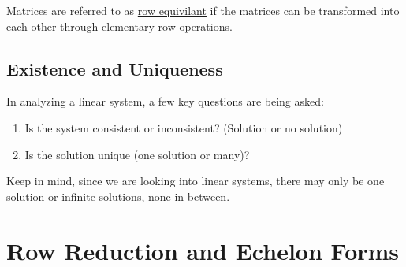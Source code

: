 \documentclass{report}
\begin{document}
\begin{definition}
	Matrices are referred to as \underline{row equivilant} if the matrices can be transformed into each other through elementary row operations.
\end{definition}

\subsection*{Existence and Uniqueness}
In analyzing a linear system, a few key questions are being asked:
\begin{enumerate}
	\item Is the system consistent or inconsistent? (Solution or no solution)
	\item Is the solution unique (one solution or many)?
\end{enumerate}
\begin{remark}
	Keep in mind, since we are looking into linear systems, there may only be one solution or infinite solutions, none in between.
\end{remark}
\section{Row Reduction and Echelon Forms}
\end{document}
